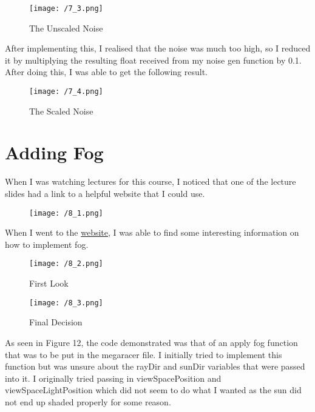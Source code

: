 \documentclass[11pt, oneside, a4paper]{article}
\begin{document}
\begin{figure}[!ht]
	\centerline{\texttt{[image: /7\_3.png]}}
	\caption{The Unscaled Noise}
	\label{fig:figure10}
\end{figure}
After implementing this, I realised that the noise was much too high, so I reduced it by multiplying the resulting float received from my noise gen function by 0.1. After doing this, I was able to get the following result.

\begin{figure}[!ht]
	\centerline{\texttt{[image: /7\_4.png]}}
	\caption{The Scaled Noise}
	\label{fig:figure10}
\end{figure}

\newpage
\section{Adding Fog}
When I was watching lectures for this course, I noticed that one of the lecture slides had a link to a helpful website that I could use. 

\begin{figure}[!ht]
	\centerline{\texttt{[image: /8\_1.png]}}
	\label{fig:figure11}
\end{figure}

When I went to the \href{https://iquilezles.org/www/articles/fog/fog.htm}{website}, I was able to find some interesting information on how to implement fog. 

\begin{figure}[H]
    \centering
    \begin{minipage}{1\textwidth}
        \centering
        \texttt{[image: /8\_2.png]}
        \caption{First Look}
    \end{minipage}
    \begin{minipage}{1\textwidth}
        \centering
        \texttt{[image: /8\_3.png]}
        \caption{Final Decision}
    \end{minipage}
\end{figure} 

As seen in Figure 12, the code demonstrated was that of an apply fog function that was to be put in the megaracer file. I initially tried to implement this function but was unsure about the rayDir and sunDir variables that were passed into it. I originally tried passing in viewSpacePosition and viewSpaceLightPosition which did not seem to do what I wanted as the sun did not end up shaded properly for some reason.
\end{document}
